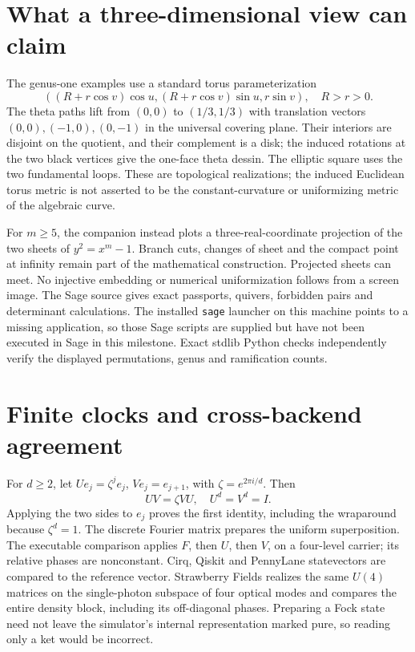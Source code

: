 \section{What a three-dimensional view can claim}
The genus-one examples use a standard torus parameterization
\[
 ((R+r\cos v)\cos u,(R+r\cos v)\sin u,r\sin v),\quad R>r>0.
\]
The theta paths lift from $(0,0)$ to $(1/3,1/3)$ with translation vectors $(0,0),(-1,0),(0,-1)$ in the universal covering plane. Their interiors are disjoint on the quotient, and their complement is a disk; the induced rotations at the two black vertices give the one-face theta dessin. The elliptic square uses the two fundamental loops. These are topological realizations; the induced Euclidean torus metric is not asserted to be the constant-curvature or uniformizing metric of the algebraic curve.

For $m\ge5$, the companion instead plots a three-real-coordinate projection of the two sheets of $y^2=x^m-1$. Branch cuts, changes of sheet and the compact point at infinity remain part of the mathematical construction. Projected sheets can meet. No injective embedding or numerical uniformization follows from a screen image. The Sage source gives exact passports, quivers, forbidden pairs and determinant calculations. The installed \texttt{sage} launcher on this machine points to a missing application, so those Sage scripts are supplied but have not been executed in Sage in this milestone. Exact stdlib Python checks independently verify the displayed permutations, genus and ramification counts.

\section{Finite clocks and cross-backend agreement}
For $d\ge2$, let $Ue_j=\zeta^j e_j$, $Ve_j=e_{j+1}$, with $\zeta=e^{2\pi i/d}$. Then
\[
 UV=\zeta VU,\quad U^d=V^d=I.
\]
Applying the two sides to $e_j$ proves the first identity, including the wraparound because $\zeta^d=1$. The discrete Fourier matrix prepares the uniform superposition. The executable comparison applies $F$, then $U$, then $V$, on a four-level carrier; its relative phases are nonconstant. Cirq, Qiskit and PennyLane statevectors are compared to the reference vector. Strawberry Fields realizes the same $U(4)$ matrices on the single-photon subspace of four optical modes and compares the entire density block, including its off-diagonal phases. Preparing a Fock state need not leave the simulator's internal representation marked pure, so reading only a ket would be incorrect.

